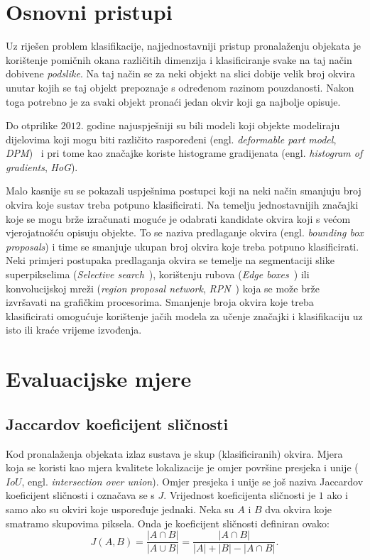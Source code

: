 \documentclass[utf8, diplomski, numeric, lmodern]{fer}
\begin{document}
\section{Osnovni pristupi}

Uz riješen problem klasifikacije, najjednostavniji pristup pronalaženju objekata je korištenje pomičnih okana različitih dimenzija i klasificiranje svake na taj način dobivene \emph{podslike}. Na taj način se za neki objekt na slici dobije velik broj okvira unutar kojih se taj objekt prepoznaje s određenom razinom pouzdanosti. Nakon toga potrebno je za svaki objekt pronaći jedan okvir koji ga najbolje opisuje. 

Do otprilike $2012$. godine najuspješniji su bili modeli koji objekte modeliraju dijelovima koji mogu biti različito raspoređeni (engl. \emph{deformable part model}, \emph{DPM})~\cite{objdet2014} i pri tome kao značajke koriste histograme gradijenata (engl. \emph{histogram of gradients}, \emph{HoG}).


Malo kasnije su se pokazali uspješnima postupci koji na neki način smanjuju broj okvira koje sustav treba potpuno klasificirati. Na temelju jednostavnijih značajki koje se mogu brže izračunati moguće je odabrati kandidate okvira koji s većom vjerojatnošću opisuju objekte. To se naziva predlaganje okvira (engl. \emph{bounding box proposals}) i time se smanjuje ukupan broj okvira koje treba potpuno klasificirati. Neki primjeri postupaka predlaganja okvira se temelje na segmentaciji slike superpikselima (\emph{Selective search}~\cite{selectiveSearch}), korištenju rubova (\emph{Edge boxes}~\cite{edgeBoxes}) ili konvolucijskoj mreži (\emph{region proposal network}, \emph{RPN}~\cite{fasterrcnn}) koja se može brže izvršavati na grafičkim procesorima. Smanjenje broja okvira koje treba klasificirati omogućuje korištenje jačih modela za učenje značajki i klasifikaciju uz isto ili kraće vrijeme izvođenja. 


\section{Evaluacijske mjere}

\subsection{Jaccardov koeficijent sličnosti}

Kod pronalaženja objekata izlaz sustava je skup (klasificiranih) okvira. Mjera koja se koristi kao mjera kvalitete lokalizacije je omjer površine presjeka i unije ($\mathit{IoU}$, engl. \emph{intersection over union}). Omjer presjeka i unije se još naziva Jaccardov koeficijent sličnosti i označava se s $J$. Vrijednost koeficijenta sličnosti je $1$ ako i samo ako su okviri koje uspoređuje jednaki. Neka su $A$ i $B$ dva okvira koje smatramo skupovima piksela. Onda je koeficijent sličnosti definiran ovako:
\begin{equation}
J(A,B) = \frac{|A\cap B|}{|A\cup B|} = \frac{|A\cap B|}{|A|+|B|-|A\cap B|}.
\end{equation}
\end{document}
